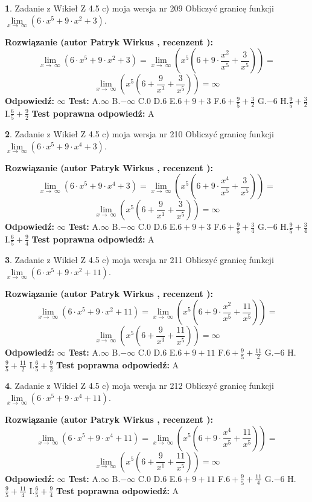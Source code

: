 \documentclass[12pt, a4paper]{article}
\theoremstyle{definition} %
\newtheorem{zad}{}
\newcommand{\zadStart}[1]{\begin{zad}#1\newline}
\newcommand{\zadStop}{\end{zad}}
\newcommand{\rozwStart}[2]{\noindent \textbf{Rozwiązanie (autor #1 , recenzent #2): }\newline}
\newcommand{\rozwStop}{\newline}
\newcommand{\odpStart}{\noindent \textbf{Odpowiedź:}\newline}
\newcommand{\odpStop}{\newline}
\newcommand{\testStart}{\noindent \textbf{Test:}\newline}
\newcommand{\testStop}{\newline}
\newcommand{\kluczStart}{\noindent \textbf{Test poprawna odpowiedź:}\newline}
\newcommand{\kluczStop}{\newline}
\begin{document}
\zadStart{Zadanie z Wikieł Z 4.5 c) moja wersja nr 209}
Obliczyć granicę funkcji  $\lim\limits_{x\to\ \infty}(6 \cdot x^{5}+9 \cdot x^{2}+3)$.
\zadStop
\rozwStart{Patryk Wirkus}{}
$$\lim\limits_{x\to\ \infty}(6 \cdot x^{5}+9 \cdot x^{2}+3) = \lim\limits_{x\to\ \infty}(x^{5}(6 +9 \cdot \frac{x^{2}}{x^{5}}+\frac{3}{x^{5}})) =$$ $$\lim\limits_{x\to\ \infty}(x^{5}(6 +\frac{9}{x^{3}}+\frac{3}{x^{5}})) =\infty$$
\rozwStop
\odpStart
$\infty$
\odpStop
\testStart
A.$\infty$ B.$-\infty$ C.$0$ D.$6$ E.$6 + 9 + 3$
F.$6+\frac{9}{5}+\frac{3}{2}$ G.$-6$
H.$\frac{9}{5}+\frac{3}{2}$
I.$\frac{6}{5}+\frac{9}{2}$
\testStop
\kluczStart
A
\kluczStop



\zadStart{Zadanie z Wikieł Z 4.5 c) moja wersja nr 210}
Obliczyć granicę funkcji  $\lim\limits_{x\to\ \infty}(6 \cdot x^{5}+9 \cdot x^{4}+3)$.
\zadStop
\rozwStart{Patryk Wirkus}{}
$$\lim\limits_{x\to\ \infty}(6 \cdot x^{5}+9 \cdot x^{4}+3) = \lim\limits_{x\to\ \infty}(x^{5}(6 +9 \cdot \frac{x^{4}}{x^{5}}+\frac{3}{x^{5}})) =$$ $$\lim\limits_{x\to\ \infty}(x^{5}(6 +\frac{9}{x^{1}}+\frac{3}{x^{5}})) =\infty$$
\rozwStop
\odpStart
$\infty$
\odpStop
\testStart
A.$\infty$ B.$-\infty$ C.$0$ D.$6$ E.$6 + 9 + 3$
F.$6+\frac{9}{5}+\frac{3}{4}$ G.$-6$
H.$\frac{9}{5}+\frac{3}{4}$
I.$\frac{6}{5}+\frac{9}{4}$
\testStop
\kluczStart
A
\kluczStop



\zadStart{Zadanie z Wikieł Z 4.5 c) moja wersja nr 211}
Obliczyć granicę funkcji  $\lim\limits_{x\to\ \infty}(6 \cdot x^{5}+9 \cdot x^{2}+11)$.
\zadStop
\rozwStart{Patryk Wirkus}{}
$$\lim\limits_{x\to\ \infty}(6 \cdot x^{5}+9 \cdot x^{2}+11) = \lim\limits_{x\to\ \infty}(x^{5}(6 +9 \cdot \frac{x^{2}}{x^{5}}+\frac{11}{x^{5}})) =$$ $$\lim\limits_{x\to\ \infty}(x^{5}(6 +\frac{9}{x^{3}}+\frac{11}{x^{5}})) =\infty$$
\rozwStop
\odpStart
$\infty$
\odpStop
\testStart
A.$\infty$ B.$-\infty$ C.$0$ D.$6$ E.$6 + 9 + 11$
F.$6+\frac{9}{5}+\frac{11}{2}$ G.$-6$
H.$\frac{9}{5}+\frac{11}{2}$
I.$\frac{6}{5}+\frac{9}{2}$
\testStop
\kluczStart
A
\kluczStop



\zadStart{Zadanie z Wikieł Z 4.5 c) moja wersja nr 212}
Obliczyć granicę funkcji  $\lim\limits_{x\to\ \infty}(6 \cdot x^{5}+9 \cdot x^{4}+11)$.
\zadStop
\rozwStart{Patryk Wirkus}{}
$$\lim\limits_{x\to\ \infty}(6 \cdot x^{5}+9 \cdot x^{4}+11) = \lim\limits_{x\to\ \infty}(x^{5}(6 +9 \cdot \frac{x^{4}}{x^{5}}+\frac{11}{x^{5}})) =$$ $$\lim\limits_{x\to\ \infty}(x^{5}(6 +\frac{9}{x^{1}}+\frac{11}{x^{5}})) =\infty$$
\rozwStop
\odpStart
$\infty$
\odpStop
\testStart
A.$\infty$ B.$-\infty$ C.$0$ D.$6$ E.$6 + 9 + 11$
F.$6+\frac{9}{5}+\frac{11}{4}$ G.$-6$
H.$\frac{9}{5}+\frac{11}{4}$
I.$\frac{6}{5}+\frac{9}{4}$
\testStop
\kluczStart
A
\kluczStop
\end{document}
